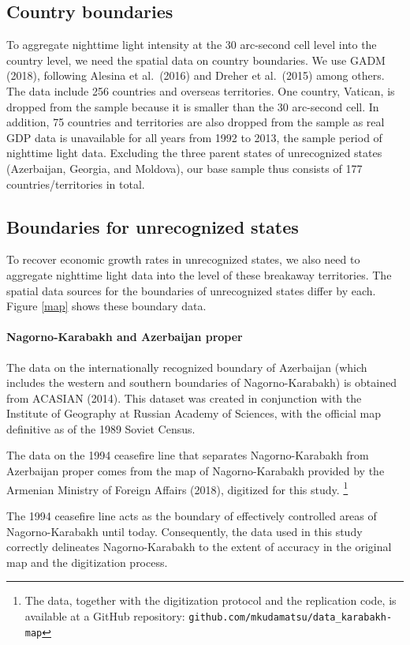 \documentclass[12pt,a4paper]{article}%
\begin{document}
\subsection{Country boundaries}
To aggregate nighttime light intensity at the 30 arc-second cell level into the country level, we need the spatial data on country boundaries. 
We use GADM (2018), following Alesina et al.\ (2016) and Dreher et al.\ (2015) among others. 
The data include 256 countries and overseas territories. 
One country, Vatican, is dropped from the sample because it is smaller than the 30 arc-second cell. 
In addition, 75 countries and territories are also dropped from the sample as real GDP data is unavailable for all years from 1992 to 2013, the sample period of nighttime light data.
Excluding the three parent states of unrecognized states (Azerbaijan, Georgia, and Moldova), our base sample thus consists of 177 countries/territories in total.

\subsection{Boundaries for unrecognized states}
To recover economic growth rates in unrecognized states, we also need to aggregate nighttime light data into the level of these breakaway territories. The spatial data sources for the boundaries of unrecognized states differ by each. Figure \ref{map} shows these boundary data.
\paragraph{Nagorno-Karabakh and Azerbaijan proper}
The data on the internationally recognized boundary of Azerbaijan (which includes the western and southern boundaries of Nagorno-Karabakh) is obtained from ACASIAN (2014). This dataset was created in conjunction with the Institute of Geography at Russian Academy of Sciences, with the official map definitive as of the 1989 Soviet Census. 

The data on the 1994 ceasefire line that separates Nagorno-Karabakh from Azerbaijan proper comes from the map of Nagorno-Karabakh provided by the Armenian Ministry of Foreign Affairs (2018), digitized for this study.%
\footnote{
	The data, together with the digitization protocol and the replication code, is available at a GitHub repository: \verb!github.com/mkudamatsu/data_karabakh-map!
}

The 1994 ceasefire line acts as the boundary of effectively controlled areas of Nagorno-Karabakh until today. Consequently, the data used in this study correctly delineates Nagorno-Karabakh to the extent of accuracy in the original map and the digitization process.
\end{document}
